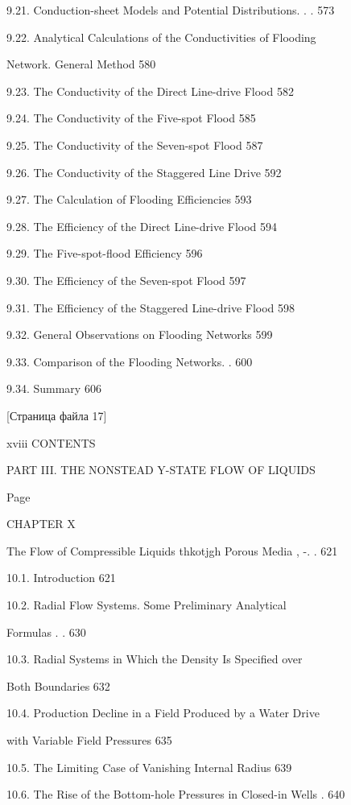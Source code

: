 \documentclass[
  11pt,
]{article}
\begin{document}
9.21. Conduction-sheet Models and Potential Distributions. . . 573 \par
9.22. Analytical Calculations of the Conductivities of Flooding \par
Network. General Method 580 \par
9.23. The Conductivity of the Direct Line-drive Flood 582 \par
9.24. The Conductivity of the Five-spot Flood 585 \par
9.25. The Conductivity of the Seven-spot Flood 587 \par
9.26. The Conductivity of the Staggered Line Drive 592 \par
9.27. The Calculation of Flooding Efficiencies 593 \par
9.28. The Efficiency of the Direct Line-drive Flood 594 \par
9.29. The Five-spot-flood Efficiency 596 \par
9.30. The Efficiency of the Seven-spot Flood 597 \par
9.31. The Efficiency of the Staggered Line-drive Flood 598 \par
9.32. General Observations on Flooding Networks 599 \par
9.33. Comparison of the Flooding Networks. . 600 \par
9.34. Summary 606 \par
\smallskip
\smallskip
\smallskip
{[}Страница файла 17{]}\par
xviii CONTENTS \par
PART III. THE NONSTEAD Y-STATE FLOW OF LIQUIDS \par
Page \par
CHAPTER X \par
The Flow of Compressible Liquids thkotjgh Porous Media , -. . 621 \par
10.1. Introduction 621 \par
10.2. Radial Flow Systems. Some Preliminary Analytical \par
Formulas \textquotesingle. . 630 \par
10.3. Radial Systems in Which the Density Is Specified over \par
Both Boundaries 632 \par
10.4. Production Decline in a Field Produced by a Water Drive \par
with Variable Field Pressures 635 \par
10.5. The Limiting Case of Vanishing Internal Radius 639 \par
10.6. The Rise of the Bottom-hole Pressures in Closed-in Wells . 640 \par
\end{document}
